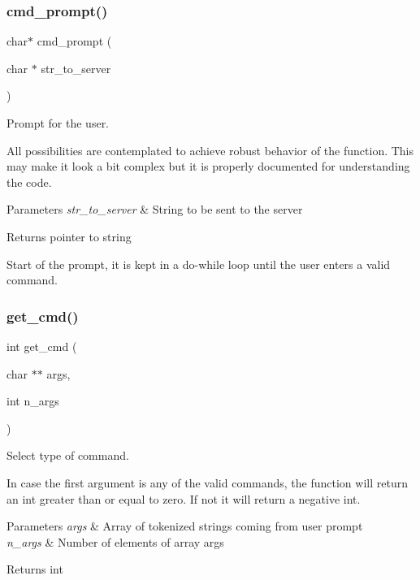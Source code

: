 \subsubsection{cmd\+\_\+prompt()}
{\footnotesize\ttfamily char$\ast$ cmd\+\_\+prompt (\begin{DoxyParamCaption}\item[{char $\ast$}]{str\+\_\+to\+\_\+server }\end{DoxyParamCaption})}



Prompt for the user. 

All possibilities are contemplated to achieve robust behavior of the function. This may make it look a bit complex but it is properly documented for understanding the code. 
\begin{DoxyParams}{Parameters}
{\em str\+\_\+to\+\_\+server} & String to be sent to the server \\
\hline
\end{DoxyParams}
\begin{DoxyReturn}{Returns}
pointer to string  
\end{DoxyReturn}
Start of the prompt, it is kept in a do-\/while loop until the user enters a valid command.\mbox{\label{prompt_8h_ae8fac212768cd6eac01f65cf151b3a43}} 
\subsubsection{get\+\_\+cmd()}
{\footnotesize\ttfamily int get\+\_\+cmd (\begin{DoxyParamCaption}\item[{char $\ast$$\ast$}]{args,  }\item[{int}]{n\+\_\+args }\end{DoxyParamCaption})}



Select type of command. 

In case the first argument is any of the valid commands, the function will return an int greater than or equal to zero. If not it will return a negative int. 
\begin{DoxyParams}{Parameters}
{\em args} & Array of tokenized strings coming from user prompt \\
\hline
{\em n\+\_\+args} & Number of elements of array args \\
\hline
\end{DoxyParams}
\begin{DoxyReturn}{Returns}
int 
\end{DoxyReturn}
\mbox{\label{prompt_8h_aaae547d76bf7da0f67987d3f2f2d537f}} 
